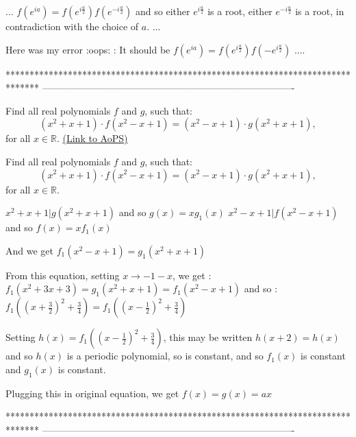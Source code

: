 \begin{solution}
	\begin{tcolorbox}...
$f(e^{ia})=f(e^{i\frac {a}2})f(e^{-i\frac {a}2})$ and so either $e^{i\frac {a}2}$ is a root, either $e^{-i\frac {a}2}$ is a root, in contradiction with the choice of $a$.
...\end{tcolorbox}

Here was my error :oops: : It should be $f(e^{ia})=f(e^{i\frac {a}2})f(-e^{i\frac {a}2})$ ....
\end{solution}
*******************************************************************************
-------------------------------------------------------------------------------

\begin{problem}
	Find all real polynomials $f$ and $g$, such that:
\[(x^2+x+1)\cdot f(x^2-x+1)=(x^2-x+1)\cdot g(x^2+x+1), \]
for all $x\in\mathbb{R}$.
	\flushright \href{https://artofproblemsolving.com/community/c6h381485}{(Link to AoPS)}
\end{problem}



\begin{solution}
	\begin{tcolorbox}Find all real polynomials $f$ and $g$, such that:
\[(x^2+x+1)\cdot f(x^2-x+1)=(x^2-x+1)\cdot g(x^2+x+1), \]
for all $x\in\mathbb{R}$.\end{tcolorbox}
$x^2+x+1|g(x^2+x+1)$ and so $g(x)=xg_1(x)$
$x^2-x+1|f(x^2-x+1)$ and so $f(x)=xf_1(x)$

And we get $f_1(x^2-x+1)=g_1(x^2+x+1)$

From this equation, setting $x\to -1-x$, we get :
$f_1(x^2+3x+3)=g_1(x^2+x+1)=f_1(x^2-x+1)$ and so :
$f_1((x+\frac 32)^2+\frac 34)=f_1((x-\frac 12)^2+\frac 34)$

Setting $h(x)=f_1((x-\frac 12)^2+\frac 34)$, this may be written $h(x+2)=h(x)$ and so $h(x)$ is a periodic polynomial, so is constant, and so $f_1(x)$ is constant and $g_1(x)$ is constant.

Plugging this in original equation, we get $\boxed{f(x)=g(x)=ax}$
\end{solution}
*******************************************************************************
-------------------------------------------------------------------------------

